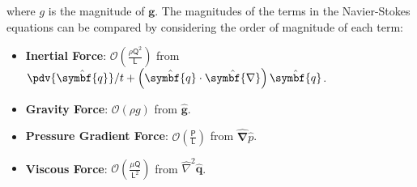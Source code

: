 \documentclass{article}
\theoremstyle{definition}
\begin{document}
where \(g\) is the magnitude of \(\symbf{g}\).
The magnitudes of the terms in the Navier-Stokes equations can be
compared by considering the order of magnitude of each term:
\begin{itemize}
    \item \textbf{Inertial Force}: \(\mathcal{O}\left( \frac{\rho \mathsf{Q}^2}{\mathsf{L}} \right)\)
          from \(
          \pdv{\hat{\symbf{q}}}/{t} + \left( \hat{\symbf{q}} \cdot \hat{\symbf{\nabla}} \right) \hat{\symbf{q}}
          \).
    \item \textbf{Gravity Force}: \(\mathcal{O}\left( \rho g \right)\)
          from \(
          \hat{\symbf{g}}
          \).
    \item \textbf{Pressure Gradient Force}: \(\mathcal{O}\left( \frac{\mathsf{P}}{\mathsf{L}} \right)\)
          from \(
          \hat{\symbf{\nabla}} \hat{p}
          \).
    \item \textbf{Viscous Force}: \(\mathcal{O}\left( \frac{\mu \mathsf{Q}}{\mathsf{L}^2} \right)\)
          from \(
          \hat{\nabla}^2 \hat{\symbf{q}}
          \).
\end{itemize}
\end{document}
